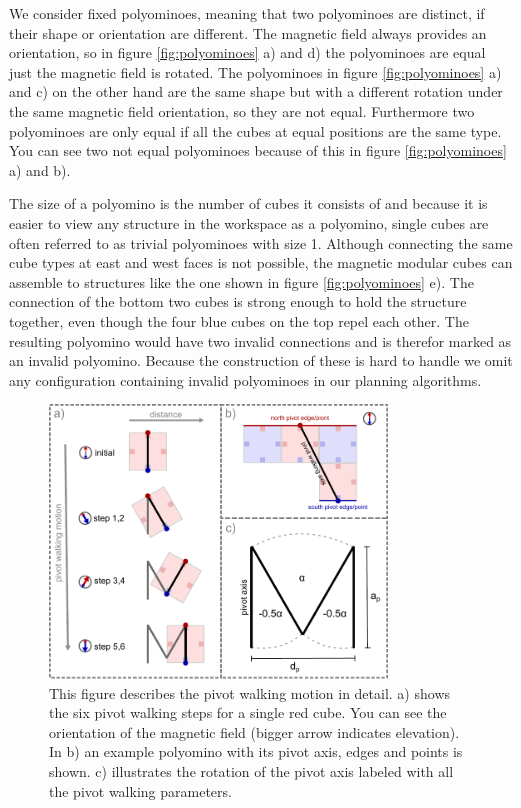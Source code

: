 We consider fixed polyominoes, meaning that two polyominoes are distinct, if their shape or orientation are different.
The magnetic field always provides an orientation, so in figure \ref{fig:polyominoes} a) and d) the polyominoes are equal just the magnetic field is rotated.
The polyominoes in figure \ref{fig:polyominoes} a) and c) on the other hand are the same shape but with a different rotation under the same magnetic field orientation, so they are not equal.
Furthermore two polyominoes are only equal if all the cubes at equal positions are the same type.
You can see two not equal polyominoes because of this in figure \ref{fig:polyominoes} a) and b).

The size of a polyomino is the number of cubes it consists of and because it is easier to view any structure in the workspace as a polyomino, single cubes are often referred to as trivial polyominoes with size 1.
Although connecting the same cube types at east and west faces is not possible, the magnetic modular cubes can assemble to structures like the one shown in figure \ref{fig:polyominoes} e).
The connection of the bottom two cubes is strong enough to hold the structure together, even though the four blue cubes on the top repel each other.
The resulting polyomino would have two invalid connections and is therefor marked as an invalid polyomino.
Because the construction of these is hard to handle we omit any configuration containing invalid polyominoes in our planning algorithms.


\begin{figure}
	\centering
	\includegraphics[width=0.80\textwidth]{figures/pivot_walking.pdf}
	\caption{This figure describes the pivot walking motion in detail. a) shows the six pivot walking steps for a single red cube. You can see the orientation of the magnetic field (bigger arrow indicates elevation). In b) an example polyomino with its pivot axis, edges and points is shown. c) illustrates the rotation of the pivot axis labeled with all the pivot walking parameters.}
	\label{fig:pivot_walking}
\end{figure}

